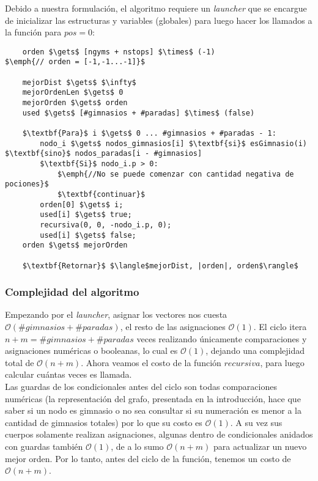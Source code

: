     Debido a nuestra formulación, el algoritmo requiere un \emph{launcher} que se encargue de inicializar las estructuras y variables (globales) para luego hacer los llamados a la función para $pos=0$:

    \begin{lstlisting}
    orden $\gets$ [ngyms + nstops] $\times$ (-1)                $\emph{// orden = [-1,-1...-1]}$

    mejorDist $\gets$ $\infty$
    mejorOrdenLen $\gets$ 0
    mejorOrden $\gets$ orden
    used $\gets$ [#gimnasios + #paradas] $\times$ (false)

    $\textbf{Para}$ i $\gets$ 0 ... #gimnasios + #paradas - 1:
        nodo_i $\gets$ nodos_gimnasios[i] $\textbf{si}$ esGimnasio(i) $\textbf{sino}$ nodos_paradas[i - #gimnasios]
        $\textbf{Si}$ nodo_i.p > 0:
            $\emph{//No se puede comenzar con cantidad negativa de pociones}$
            $\textbf{continuar}$
        orden[0] $\gets$ i;
        used[i] $\gets$ true;
        recursiva(0, 0, -nodo_i.p, 0);
        used[i] $\gets$ false;
    orden $\gets$ mejorOrden

    $\textbf{Retornar}$ $\langle$mejorDist, |orden|, orden$\rangle$
    \end{lstlisting}

    \subsubsection{Complejidad del algoritmo}

    Empezando por el \emph{launcher}, asignar los vectores nos cuesta $\mathcal{O}(\#gimnasios + \#paradas)$, el resto de las asignaciones $\mathcal{O}(1)$. El ciclo itera $n+m = \#gimnasios + \#paradas$ veces realizando únicamente comparaciones y asignaciones numéricas o booleanas, lo cual es $\mathcal{O}(1)$, dejando una complejidad total de $\mathcal{O}(n+m)$. Ahora veamos el costo de la función $recursiva$, para luego calcular cuántas veces es llamada.
    \\

    Las guardas de los condicionales antes del ciclo son todas comparaciones numéricas (la representación del grafo, presentada en la introducción, hace que saber si un nodo es gimnasio o no sea consultar si su numeración es menor a la cantidad de gimnasios totales) por lo que su costo es $\mathcal{O}(1)$. A su vez sus cuerpos solamente realizan asignaciones, algunas dentro de condicionales anidados con guardas también $\mathcal{O}(1)$, de a lo sumo $\mathcal{O}(n+m)$ para actualizar un nuevo mejor orden. Por lo tanto, antes del ciclo de la función, tenemos un costo de $\mathcal{O}(n+m)$.
    \\

